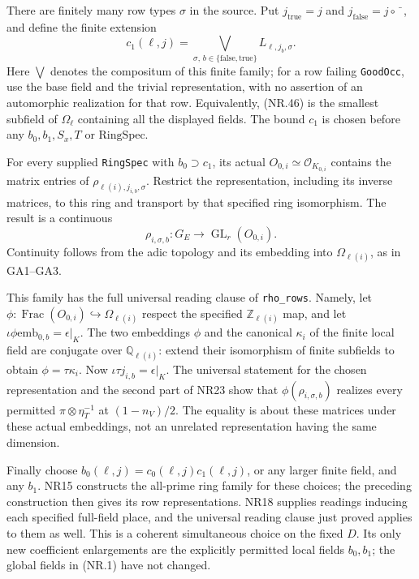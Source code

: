 There are finitely many row types $\sigma$ in the source. Put
$j_{\mathrm{true}}=j$ and $j_{\mathrm{false}}=j\circ\bar{\phantom x}$,
and define the finite extension
\[
 c_1(\ell,j)=\bigvee_{\sigma,\,b\in\{\mathrm{false},\mathrm{true}\}}
                               L_{\ell,j_b,\sigma}.   \tag{NR.46}
\]
Here $\bigvee$ denotes the compositum of this finite family;
for a row failing \texttt{GoodOcc}, use the base field and the
trivial representation, with no assertion of an automorphic
realization for that row. Equivalently, (NR.46) is the smallest
subfield of $\Omega_\ell$ containing all the displayed fields.
The bound $c_1$ is chosen before any $b_0,b_1,S_x,T$ or
$\mathrm{RingSpec}$.

For every supplied \texttt{RingSpec} with $b_0\supset c_1$,
its actual $O_{0,i}\simeq\mathcal O_{K_{0,i}}$ contains the
matrix entries of $\rho_{\ell(i),j_{i,b},\sigma}$. Restrict the
representation, including its inverse matrices, to this ring
and transport by that specified ring isomorphism. The result
is a continuous
\[
       \rho_{i,\sigma,b}:G_E\longrightarrow
                                      \operatorname{GL}_r(O_{0,i}).
                                                               \tag{NR.47}
\]
Continuity follows from the adic topology and its embedding
into $\Omega_{\ell(i)}$, as in GA1--GA3.

This family has the full universal reading clause of
\texttt{rho\_rows}. Namely, let
$\phi:\operatorname{Frac}(O_{0,i})\hookrightarrow\Omega_{\ell(i)}$
respect the specified $\mathbb Z_{\ell(i)}$ map, and let
$\iota\phi\mathrm{emb}_{0,b}=\epsilon|_K$.
The two embeddings $\phi$ and the canonical $\kappa_i$ of the
finite local field are conjugate over $\mathbb Q_{\ell(i)}$:
extend their isomorphism of finite subfields to obtain
$\phi=\tau\kappa_i$. Now
$\iota\tau j_{i,b}=\epsilon|_K$. The universal statement for the
chosen representation and the second part of NR23 show that
$\phi(\rho_{i,\sigma,b})$ realizes every permitted
$\pi\otimes\eta_T^{-1}$ at $(1-n_V)/2$. The equality is about
these matrices under these actual embeddings, not an unrelated
representation having the same dimension.

Finally choose $b_0(\ell,j)=c_0(\ell,j)c_1(\ell,j)$, or any
larger finite field, and any $b_1$. NR15 constructs the all-prime
ring family for these choices; the preceding construction then
gives its row representations. NR18 supplies readings inducing
each specified full-field place, and the universal reading
clause just proved applies to them as well. This is a coherent
simultaneous choice on the fixed $D$. Its only new coefficient
enlargements are the explicitly permitted local fields $b_0,b_1$;
the global fields in (NR.1) have not changed.

